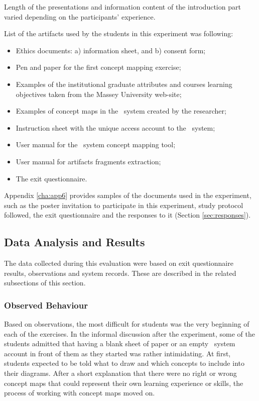 \FloatBarrier

Length of the presentations and information content of the introduction part
varied depending on the participants' experience.

List of the artifacts used by the students in this experiment was following:

\begin{itemize}
  \item Ethics documents: a) information sheet, and b) consent form;
  \item Pen and paper for the first concept mapping exercise;
  \item Examples of the institutional graduate attributes and courses learning
  objectives taken from the Massey University web-site;
  \item Examples of concept maps in the \ep~system created by the researcher;
  \item Instruction sheet with the unique access account to the \ep~system;
  \item User manual for the \ep~system concept mapping tool;
  \item User manual for artifacts fragments extraction;
  \item The exit questionnaire.
\end{itemize} 

Appendix \ref{cha:app6} provides samples of the documents used in the
experiment, such as the poster invitation to participate in this experiment,
study protocol followed, the exit questionnaire and the responses to it (Section
\ref{sec:responses}).

\subsection{Data Analysis and Results}

The data collected during this evaluation were based on exit questionnaire
results, observations and system records. These are described in the related
subsections of this section.

\subsubsection{Observed Behaviour}

Based on observations, the most difficult for students was the very beginning of
each of the exercises. In the informal discussion after the experiment, some
of the students admitted that having a blank sheet of paper or an empty
\ep~system account in front of them as they started was rather intimidating. At
first, students expected to be told what to draw and which concepts to include
into their diagrams. After a short explanation that there were no right or wrong
concept maps that could represent their own learning experience or skills, the
process of working with concept maps moved on.

